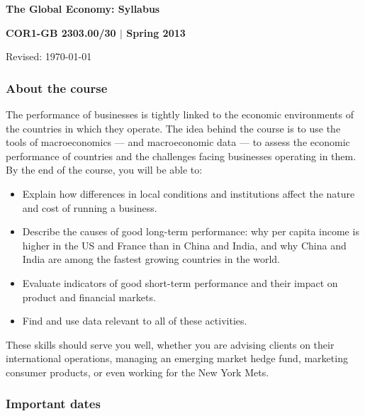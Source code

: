 \documentclass[12pt]{article}
\begin{document}
\thispagestyle{empty}
\bigskipamount
\Head
\centerline{\large\bf The Global Economy:  Syllabus}
\vspace{1mm}
\centerline{\large\bf COR1-GB 2303.00/30 $|$ Spring 2013}
\vspace{1mm}
\centerline{Revised:  \today}

\subsubsection*{About the course}

The performance of businesses is tightly linked to the
economic environments of the countries in which they operate.
The idea behind the course is to use the tools of macroeconomics
--- and macroeconomic data ---
to assess the economic performance of countries
and the challenges facing businesses operating in them.
By the end of the course, you will be able to:
%
\begin{itemize}
\item Explain how differences in local conditions
and institutions
affect the nature and cost of running a business.

\item Describe the causes of good long-term performance: why per
capita income is higher in the US and France than in China and India,
and why China and India are among the fastest growing countries in the
world.

\item Evaluate indicators of good short-term performance
and their impact on product and financial markets.


\item Find and use data relevant to all of these activities.

\end{itemize}
%
These skills should serve you well, whether you are
advising clients on their international operations,
managing an emerging market hedge fund,
marketing consumer products,
or even working for the New York Mets.


\subsubsection*{Important dates}
\end{document}
